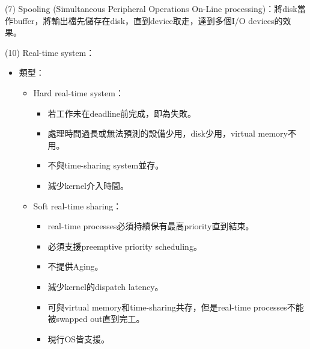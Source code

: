 \begin{theorem}{(7)} Spooling (Simultaneous Peripheral Operations On-Line processing)：將disk當作buffer，將輸出檔先儲存在disk，直到device取走，達到多個I/O devices的效果。
\end{theorem}

\begin{theorem}{(10)} Real-time system：\begin{itemize}
        \item 類型：\begin{itemize}
            \item Hard real-time system：\begin{itemize}
                \item 若工作未在deadline前完成，即為失敗。
                \item 處理時間過長或無法預測的設備少用，disk少用，virtual memory不用。
                \item 不與time-sharing system並存。
                \item 減少kernel介入時間。
            \end{itemize}
            \item Soft real-time sharing：\begin{itemize}
                \item real-time processes必須持續保有最高priority直到結束。
                \item 必須支援preemptive priority scheduling。
                \item 不提供Aging。
                \item 減少kernel的dispatch latency。
                \item 可與virtual memory和time-sharing共存，但是real-time processes不能被swapped out直到完工。
                \item 現行OS皆支援。
            \end{itemize}
        \end{itemize}
    \end{itemize}
\end{theorem}
